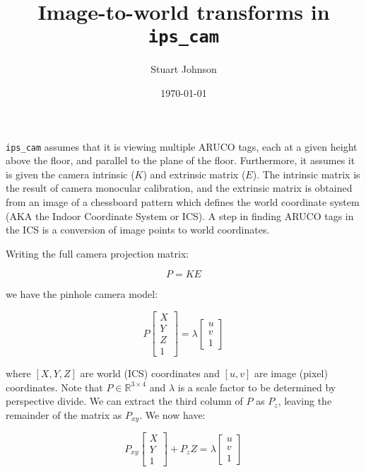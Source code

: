 \documentclass[11pt]{article}
\title{Image-to-world transforms in \texttt{ips\_cam}}
\author{Stuart Johnson}
\affil{stuart.g.johnson@gmail.com}
\date{\today}
\begin{document}
\maketitle

\texttt{ips\_cam} assumes that it is viewing multiple ARUCO tags, each at a given height above the floor, and parallel to the plane of the floor. Furthermore, it assumes it is given the camera intrinsic ($K$) and extrinsic matrix ($E$). The intrinsic matrix is the result of camera monocular calibration, and the extrinsic matrix is obtained from an image of a chessboard pattern which defines the world coordinate system (AKA the Indoor Coordinate System or ICS). A step in finding ARUCO tags in the ICS is a conversion of image points to world coordinates.

Writing the full camera projection matrix:

\begin{equation}
P = K E
\end{equation}

we have the pinhole camera model:

\begin{equation}
P \begin{bmatrix}
X \\
Y \\
Z \\
1
\end{bmatrix}
= \lambda \begin{bmatrix}
u \\
v \\
1
\end{bmatrix}
\end{equation}

where $[X,Y,Z]$ are world (ICS) coordinates and $[u,v]$ are image (pixel) coordinates. Note that $P \in \mathbb{R}^{3 \times 4}$ and $\lambda$ is a scale factor to be determined by perspective divide. We can extract the third column of $P$ as $P_z$, leaving the remainder of the matrix as $P_{xy}$. We now have:

\begin{equation}
P_{xy} \begin{bmatrix}
X \\
Y \\
1
\end{bmatrix}
+
P_z Z
= \lambda \begin{bmatrix}
u \\
v \\
1
\end{bmatrix}
\end{equation}
\end{document}
